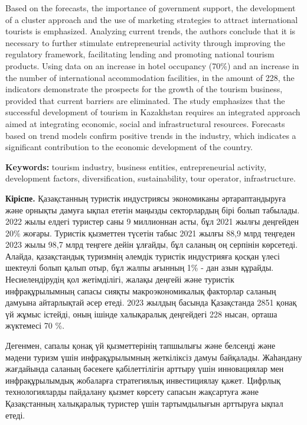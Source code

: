 Based on the forecasts, the importance of government support, the
development of a cluster approach and the use of marketing strategies to
attract international tourists is emphasized. Analyzing current trends,
the authors conclude that it is necessary to further stimulate
entrepreneurial activity through improving the regulatory framework,
facilitating lending and promoting national tourism products. Using data
on an increase in hotel occupancy (70\%) and an increase in the number
of international accommodation facilities, in the amount of 228, the
indicators demonstrate the prospects for the growth of the tourism
business, provided that current barriers are eliminated. The study
emphasizes that the successful development of tourism in Kazakhstan
requires an integrated approach aimed at integrating economic, social
and infrastructural resources. Forecasts based on trend models confirm
positive trends in the industry, which indicates a significant
contribution to the economic development of the country.

{\bfseries Keywords:} tourism industry, business entities, entrepreneurial
activity, development factors, diversification, sustainability, tour
operator, infrastructure.

{\bfseries Кіріспе.} Қазақстанның туристік индустриясы экономиканы
әртараптандыруға және орнықты дамуға ықпал ететін маңызды секторлардың
бірі болып табылады. 2022 жылы елдегі туристер саны 9 миллионнан асты,
бұл 2021 жылғы деңгейден 20\% жоғары. Туристік қызметтен түсетін табыс
2021 жылғы 88,9 млрд теңгеден 2023 жылы 98,7 млрд теңгеге дейін ұлғайды,
бұл саланың оң серпінін көрсетеді. Алайда, қазақстандық туризмнің
әлемдік туристік индустрияға қосқан үлесі шектеулі болып қалып отыр, бұл
жалпы ағынның 1\% - дан азын құрайды. Несиелендірудің қол жетімділігі,
жалақы деңгейі және туристік инфрақұрылымның сапасы сияқты
макроэкономикалық факторлар саланың дамуына айтарлықтай әсер етеді. 2023
жылдың басында Қазақстанда 2851 қонақ үй жұмыс істейді, оның ішінде
халықаралық деңгейдегі 228 нысан, орташа жүктемесі 70 \%.

Дегенмен, сапалы қонақ үй қызметтерінің тапшылығы және белсенді және
мәдени туризм үшін инфрақұрылымның жеткіліксіз дамуы байқалады.
Жаһандану жағдайында саланың бәсекеге қабілеттілігін арттыру үшін
инновациялар мен инфрақұрылымдық жобаларға стратегиялық инвестициялау
қажет. Цифрлық технологияларды пайдалану қызмет көрсету сапасын
жақсартуға және Қазақстанның халықаралық туристер үшін тартымдылығын
арттыруға ықпал етеді.

